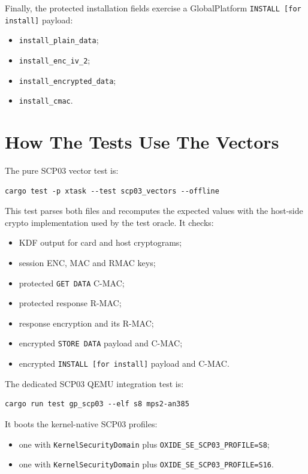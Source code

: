 Finally, the protected installation fields exercise a GlobalPlatform
\texttt{INSTALL [for install]} payload:
\begin{itemize}
\item \texttt{install\_plain\_data};
\item \texttt{install\_enc\_iv\_2};
\item \texttt{install\_encrypted\_data};
\item \texttt{install\_cmac}.
\end{itemize}

\section{How The Tests Use The Vectors}

The pure SCP03 vector test is:

\begin{verbatim}
cargo test -p xtask --test scp03_vectors --offline
\end{verbatim}

This test parses both files and recomputes the expected values with the
host-side crypto implementation used by the test oracle. It checks:
\begin{itemize}
\item KDF output for card and host cryptograms;
\item session ENC, MAC and RMAC keys;
\item protected \texttt{GET DATA} C-MAC;
\item protected response R-MAC;
\item response encryption and its R-MAC;
\item encrypted \texttt{STORE DATA} payload and C-MAC;
\item encrypted \texttt{INSTALL [for install]} payload and C-MAC.
\end{itemize}

The dedicated SCP03 QEMU integration test is:

\begin{verbatim}
cargo run test gp_scp03 --elf s8 mps2-an385
\end{verbatim}

It boots the kernel-native SCP03 profiles:
\begin{itemize}
\item one with \texttt{KernelSecurityDomain} plus
      \texttt{OXIDE\_SE\_SCP03\_PROFILE=S8};
\item one with \texttt{KernelSecurityDomain} plus
      \texttt{OXIDE\_SE\_SCP03\_PROFILE=S16}.
\end{itemize}

